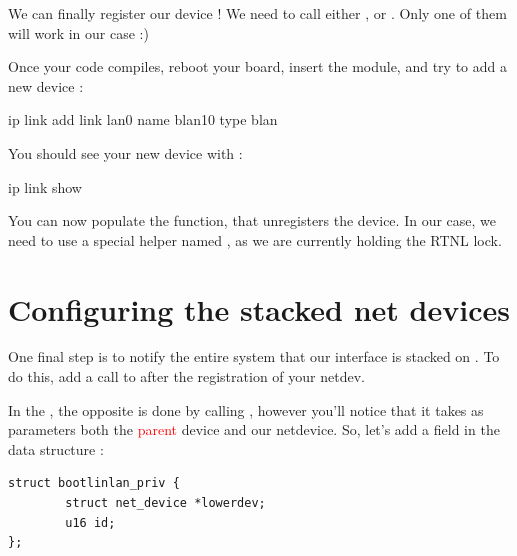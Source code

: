 We can finally register our device ! We need to call either , or . Only one of them will work in our case :)

Once your code compiles, reboot your board, insert the module, and try to add a new  device :

\begin{targetbashinput}
ip link add link lan0 name blan10 type blan
\end{targetbashinput}

You should see your new device with :

\begin{targetbashinput}
ip link show
\end{targetbashinput}

You can now populate the  function, that unregisters the device. In our case, we need to use
a special helper named , as we are currently holding the RTNL lock.

\section{Configuring the stacked net devices}

One final step is to notify the entire system that our  interface is stacked on \textcolor{red}{}. To do this, add a call to  after the registration of your netdev.

In the , the opposite is done by calling , however you'll notice that it takes as parameters both the \textcolor{red}{parent} device and our netdevice. So, let's add a  field in the  data structure :

\begin{verbatim}
struct bootlinlan_priv {
        struct net_device *lowerdev;
        u16 id;
};
\end{verbatim}

